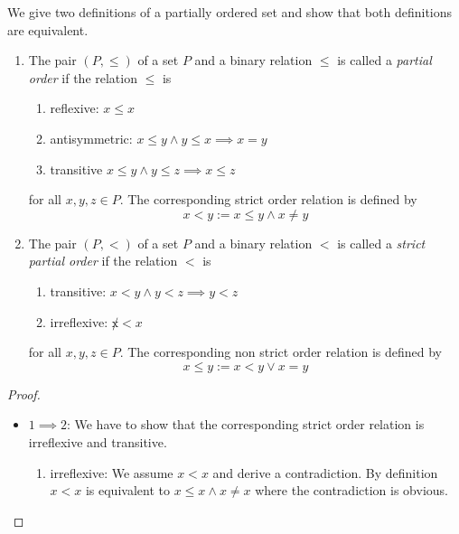 \begin{definition}
    \label{defPoset}
    We give two definitions of a partially ordered set and show that both
    definitions are equivalent.

    \begin{enumerate}
        \item
            The pair $(P, \le)$ of a set $P$ and a binary relation $\le$ is
            called a
            \emph{partial order}
            if the relation $\le$ is
            \begin{enumerate}
                \item reflexive: $x \le x$

                \item antisymmetric: $x \le y \land y \le x \implies x = y$

                \item transitive $x \le y \land y \le z \implies x \le z$
            \end{enumerate}
            for all $x, y, z \in P$. The corresponding strict order relation is
            defined by
            $$
                x < y := x \le y \land x \ne y
            $$

        \item The pair $(P, <)$ of a set $P$ and a binary relation $<$ is called
            a \emph{strict partial order} if the relation $<$ is
            \begin{enumerate}
                \item transitive: $x < y \land y < z \implies y < z$
                \item irreflexive: $\not x < x$
            \end{enumerate}
            for all $x, y, z \in P$. The corresponding non strict order
            relation is defined by
            $$
                x \le y := x < y \lor x = y
            $$
    \end{enumerate}

    \begin{proof}
        \begin{itemize}
            \item $1 \implies 2$: We have to show that the corresponding strict
                order relation is irreflexive and transitive.

                \begin{enumerate}
                    \item irreflexive: We assume $x < x$ and derive a
                        contradiction. By definition $x < x$ is equivalent to $x
                        \le x \land x \ne x$ where the contradiction is obvious.


\end{enumerate}
\end{itemize}
\end{proof}
\end{definition}

